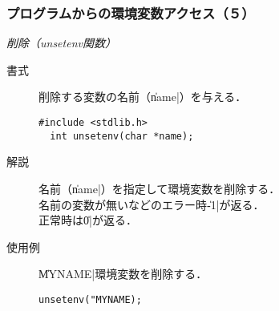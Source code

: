\documentclass{beamer}                 %
\begin{document}
\begin{frame}[fragile]
  \frametitle{プログラムからの環境変数アクセス（５）}
  \emph{削除（unsetenv関数）}
  \begin{description}
  \item [書式] 削除する変数の名前（\|name|）を与える．
\begin{lstlisting}[numbers=none]
  #include <stdlib.h>
  int unsetenv(char *name);
\end{lstlisting}
  \item [解説] 名前（\|name|）を指定して環境変数を削除する．\\
    名前の変数が無いなどのエラー時\|-1|が返る．\\
    正常時は\|0|が返る．
  \item [使用例] \|MYNAME|環境変数を削除する．
\begin{lstlisting}[numbers=none]
  unsetenv("MYNAME);
\end{lstlisting}
  \end{description}
  \vfill
\end{frame}
\end{document}
